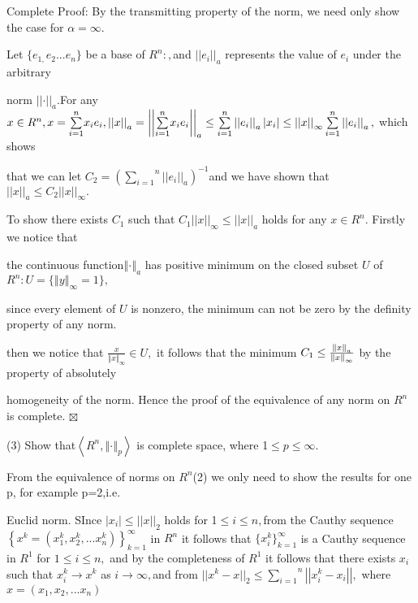 \documentclass{article}
\begin{document}
Complete Proof: By the transmitting property of the norm, we need only show
the case for $\alpha =\infty .$

Let $\{e_{1,}e_{2}...e_{n}\}$ be a base of $R^{n}:,$and $\left\vert
\left\vert e_{i}\right\vert \right\vert _{a}$ represents the value of $e_{i}$
under the arbitrary

norm $\left\vert \left\vert \cdot \right\vert \right\vert _{a}.$For any $%
x\in R^{n},x=\overset{n}{\underset{i=1}{\sum }}x_{i}e_{i},\left\vert
\left\vert x\right\vert \right\vert _{a}=\left\vert \left\vert \overset{n}{%
\underset{i=1}{\sum }}x_{i}e_{i}\right\vert \right\vert _{a}\leq \overset{n}{%
\underset{i=1}{\sum }}\left\vert \left\vert e_{i}\right\vert \right\vert
_{a}\left\vert x_{i}\right\vert \leq \left\vert \left\vert x\right\vert
\right\vert _{\infty }\overset{n}{\underset{i=1}{\sum }}\left\vert
\left\vert e_{i}\right\vert \right\vert _{a},$ which shows

that we can let $C_{2}=\left( \overset{n}{\underset{i=1}{\sum }}\left\vert
\left\vert e_{i}\right\vert \right\vert _{a}\right) ^{-1}$and we have shown
that $||x||_{a}\leq C_{2}\left\vert \left\vert x\right\vert \right\vert
_{\infty }.$

To show there exists $C_{1}$ such that $C_{1}\left\vert \left\vert
x\right\vert \right\vert _{\infty }\leq ||x||_{a}$ holds for any $x\in
R^{n}. $ Firstly we notice that

the continuous function$\left\Vert \cdot \right\Vert _{a}$ has positive
minimum on the closed subset $U$ of $R^{n}:U=\{\left\Vert y\right\Vert
_{\infty }=1\},$

since every element of $U$ is nonzero, the minimum can not be zero by the
definity property of any norm.

then we notice that $\frac{x}{\left\Vert x\right\Vert _{\infty }}\in U,$ it
follows that the minimum $C_{1}\leq \frac{\left\Vert x\right\Vert _{a}}{%
\left\Vert x\right\Vert _{\infty }}$ by the property of absolutely \qquad
\qquad\ \ 

homogeneity of the norm. Hence the proof of the equivalence of any norm on $%
R^{n}$ is complete. $\boxtimes $

(3) Show that$\left\langle R^{n},\left\Vert \cdot \right\Vert
_{p}\right\rangle $ is complete space, where 1$\leq p\leq \infty $.

From the equivalence of norms on $R^{n}$(2) we only need to show the results
for one p, for example p=2,i.e. 

Euclid norm. SInce $\left\vert x_{i}\right\vert \leq ||x||_{2}$ holds for  1$%
\leq i\leq n,$from the Cauthy sequence$\left\{ x^{k}=\left(
x_{1}^{k},x_{2}^{k},...x_{n}^{k}\right) \right\} _{k=1}^{\infty }$ in $R^{n}$
it follows that $\{x_{i}^{k}\}_{k=1}^{\infty }$ is a Cauthy sequence in $%
R^{1}$ for $1\leq i\leq n,$ and by the completeness of $R^{1}$ it follows
that there exists $x_{i}$ such that $x_{i}^{k}\rightarrow x^{k}$ as $%
i\rightarrow \infty ,$and from $||x^{k}-x||_{2}\leq \overset{n}{\underset{i=1%
}{\sum }}\left\vert \left\vert x_{i}^{k}-x_{i}\right\vert \right\vert ,$%
where $x=\left( x_{1},x_{2},...x_{n}\right) $
\end{document}
